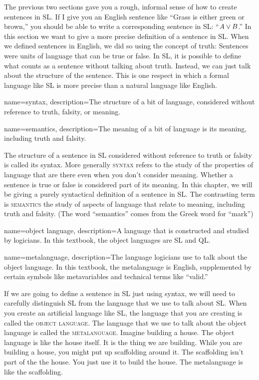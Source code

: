 The previous two sections gave you a rough, informal sense of how to create sentences in SL. If I give you an English sentence like ``Grass is either green or brown,'' you should be able to write a corresponding sentence in SL: ``$A \vee B$.'' In this section we want to give a more precise definition of a sentence in SL.  When we defined sentences in English, we did so using the concept of truth: Sentences were units of language that can be true or false. In SL, it is possible to define what counts as a sentence without talking about truth. Instead, we can just talk about the structure of the sentence. This is one respect in which a formal language like SL is more precise than a natural language like English.

{
name=syntax,
description={The structure of a bit of language, considered without reference to truth, falsity, or meaning.}
}

{
name=semantics,
description={The meaning of a bit of language is its meaning, including truth and falsity.}
}

The structure of a sentence in SL considered without reference to truth or falsity is called its syntax. More generally \textsc{\gls{syntax}} \label{def:syntax} refers to the study of the properties of language that are there even when you don't consider meaning. Whether a sentence is true or false is considered part of its meaning. In this chapter, we will be giving a purely syntactical definition of a sentence in SL.  The contrasting term is \textsc{\gls{semantics}} \label{def:semantics} the study of aspects of language that relate to meaning, including truth and falsity. (The word ``semantics'' comes from the Greek word for ``mark'')

{
name=object language,
description={A language that is constructed and studied by logicians. In this textbook, the object languages are SL and QL.}
}

{
name=metalanguage,
description={The language logicians use to talk about the object language. In this textbook, the metalanguage is English, supplemented by certain symbols like metavariables and technical terms like ``valid.''}
}

If we are going to define a sentence in SL just using syntax, we will need to carefully distinguish SL from the language that we use to talk about SL. When you create an artificial language like SL, the language that you are creating is called the \textsc{\gls{object language}}. \label{def:object_language} The language that we use to talk about the object language is called the \textsc{\gls{metalanguage}}. \label{def:metalanguage} Imagine building a house. The object language is like the house itself. It is the thing we are building. While you are building a house, you might put up scaffolding around it. The scaffolding isn't part of the the house. You just use it to build the house. The metalanguage is like the scaffolding. 

